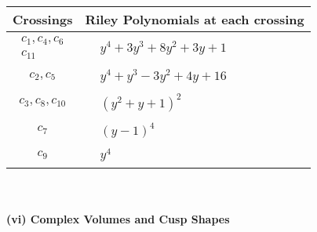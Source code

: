 \documentclass[1p]{elsarticle_modified}
\theoremstyle{definition}
\begin{document}
\begin{tabular}{m{50pt}|m{274pt}}
Crossings & \hspace{64pt}Riley Polynomials at each crossing \\
\hline $$\begin{aligned}c_{1},c_{4},c_{6}\\c_{11}\end{aligned}$$&$\begin{aligned}
&y^4+3 y^3+8 y^2+3 y+1
\end{aligned}$\\
\hline $$\begin{aligned}c_{2},c_{5}\end{aligned}$$&$\begin{aligned}
&y^4+y^3-3 y^2+4 y+16
\end{aligned}$\\
\hline $$\begin{aligned}c_{3},c_{8},c_{10}\end{aligned}$$&$\begin{aligned}
&(y^2+y+1)^2
\end{aligned}$\\
\hline $$\begin{aligned}c_{7}\end{aligned}$$&$\begin{aligned}
&(y-1)^4
\end{aligned}$\\
\hline $$\begin{aligned}c_{9}\end{aligned}$$&$\begin{aligned}
&y^4
\end{aligned}$\\
\hline
\end{tabular}\\~\\
\newpage\flushleft \textbf{(vi) Complex Volumes and Cusp Shapes}
\end{document}
